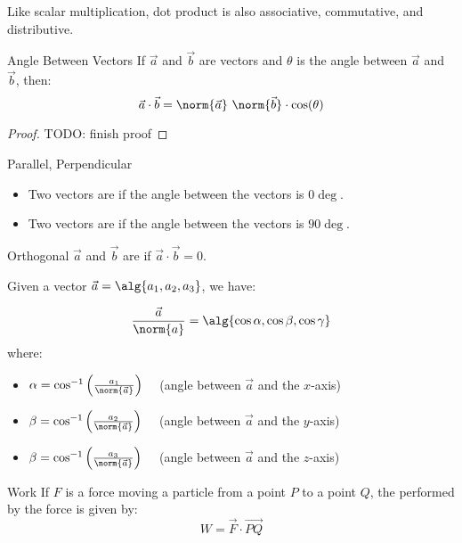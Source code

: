 \documentclass[12pt]{report}
\begin{document}
Like scalar multiplication, dot product is also associative, commutative, and distributive.

\begin{thmbox}{Angle Between Vectors}{}
    If $\vec{a}$ and $\vec{b}$ are vectors and $\theta$ is the angle between $\vec{a}$ and $\vec{b}$, then:
    \[ \vec{a} \cdot \vec{b} = \norm{\vec{a}} \ \norm{\vec{b}} \cdot \cos(\theta) \]
    \tcblower
    \begin{proof}
        TODO: finish proof
    \end{proof}
\end{thmbox}

\begin{dfnbox}{Parallel, Perpendicular}{}
    \begin{itemize}[noitemsep]
        \item Two vectors are  if the angle between the vectors is $0\deg$.
        \item Two vectors are  if the angle between the vectors is $90\deg$.
    \end{itemize}
\end{dfnbox}

\begin{dfnbox}{Orthogonal}{}
    $\vec{a}$ and $\vec{b}$ are  if $\vec{a} \cdot \vec{b} = 0$.
\end{dfnbox}

Given a vector $\vec{a} = \alg{a_1, a_2, a_3}$, we have:

\[ \frac{\vec{a}}{\norm{a}} = \alg{\cos \alpha, \cos \beta, \cos \gamma} \]
where:
\begin{itemize}
    \item $\alpha = \cos^{-1} \left( \frac{a_1}{\norm{\vec{a}}} \right) \quad$ (angle between $\vec{a}$ and the $x$-axis)
    \item $\beta = \cos^{-1} \left( \frac{a_2}{\norm{\vec{a}}} \right) \quad$ (angle between $\vec{a}$ and the $y$-axis)
    \item $\beta = \cos^{-1} \left( \frac{a_3}{\norm{\vec{a}}} \right) \quad$ (angle between $\vec{a}$ and the $z$-axis)
\end{itemize}

\begin{dfnbox}{Work}{}
    If $F$ is a force moving a particle from a point $P$ to a point $Q$, the  performed by the force is given by:
    \[ W = \vec{F} \cdot \overrightarrow{PQ} \]
\end{dfnbox}
\end{document}
